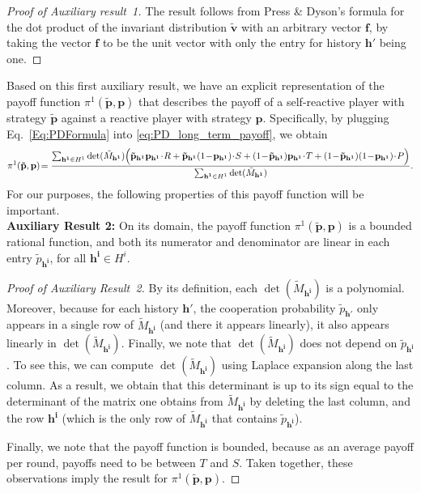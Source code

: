 \documentclass[9pt,twoside,lineno]{pnas-new}
\theoremstyle{plainCl1}
\theoremstyle{plainCl2}
\begin{document}
\begin{proof}[Proof of Auxiliary result~1]
The result follows from Press \& Dyson's formula for the dot product of the invariant distribution $\mathbf{\tilde v}$ with an arbitrary vector $\mathbf{f}$, by taking the vector $\mathbf{f}$ to be the unit vector with only the entry for history $\mathbf{h'}$ being one. 
\end{proof}

\noindent
Based on this first auxiliary result, we have an explicit representation of the payoff function $\pi^1(\mathbf{\tilde p},\mathbf{p})$ that describes the payoff of a self-reactive player with strategy $\mathbf{\tilde p}$ against a reactive player with strategy $\mathbf{p}$. 
Specifically, by plugging Eq.~\eqref{Eq:PDFormula} into \eqref{eq:PD_long_term_payoff}, we obtain
\begin{equation} \small
\pi^1(\mathbf{\tilde p},\mathbf{p}) \!=\frac{\sum_{\mathbf{h^1}\in H^1}\det(\tilde M_\mathbf{h^1})
\Big(
\mathbf{\tilde p}_\mathbf{h^1} \mathbf{p}_\mathbf{h^1}\!\cdot\!R +
\mathbf{\tilde p}_\mathbf{h^1} (1\!-\!\mathbf{p}_\mathbf{h^1})\!\cdot\!S +  
(1\!-\!\mathbf{\tilde p}_\mathbf{h^1}) \mathbf{p}_\mathbf{h^1}\!\cdot\!T +
(1\!-\!\mathbf{\tilde p}_\mathbf{h^1}) (1\!-\!\mathbf{p}_\mathbf{h^1})\!\cdot\!P 
\Big)}
{\sum_{\mathbf{h^1}\in H^1} \det(\tilde M_{\mathbf{h^1}})}.
\end{equation}
For our purposes, the following properties of this payoff function will be important.\\

\noindent
{\bf Auxiliary Result 2:}
On its domain, the payoff function $\pi^1(\mathbf{\tilde p},\mathbf{p})$ is a bounded rational function, and both its numerator and denominator are linear in each entry $\tilde p_\mathbf{h^i} $, for all $\mathbf{h^i}\!\in\!H^i$.

\begin{proof}[Proof of Auxiliary Result~2]
By its definition, each $\det(\tilde M_\mathbf{h^i})$ is a polynomial. Moreover, because for each history $\mathbf{h'}$, the cooperation probability $\tilde p_\mathbf{h'}$ only appears in a single row of $\tilde M_\mathbf{h^i}$ (and there it appears linearly), it also appears linearly in  $\det(\tilde M_\mathbf{h^i})$. Finally, we note that $\det(\tilde M_\mathbf{h^i})$ does not depend on $\tilde p_\mathbf{h^i}$. To see this, we can compute $\det(\tilde M_\mathbf{h^i})$ using Laplace expansion along the last column. As a result, we obtain that this determinant is up to its sign equal to the determinant of the matrix one obtains from $\tilde M_\mathbf{h^i}$ by deleting the last column, and the row $\mathbf{h^i}$ (which is the only row of $\tilde M_\mathbf{h^i}$ that contains $\tilde p_\mathbf{h^i}$). 

Finally, we note that the payoff function is bounded, because as an average payoff per round, payoffs need to be between $T$ and $S$. Taken together, these observations imply the result for $\pi^1(\mathbf{\tilde p},\mathbf{p})$. 
\end{proof}
\end{document}
